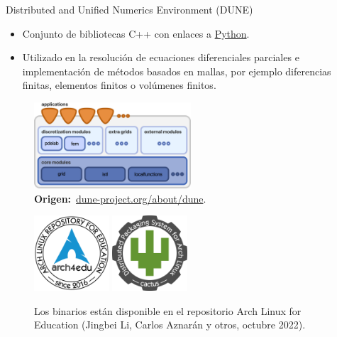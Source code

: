 \begin{frame}
\begin{alertblock}{Distributed and Unified Numerics Environment (DUNE)}
\begin{itemize}
			\item

			      Conjunto de bibliotecas \alert{C++} con enlaces a
			      \href{https://pypi.org/search/?q=dune-}{\alert{Python}}.


			\item

			      Utilizado en la resolución de
			      \alert{ecuaciones diferenciales parciales} e
			      implementación de métodos basados en mallas, por ejemplo
			      diferencias finitas, elementos finitos o volúmenes
			      finitos.
		\end{itemize}
	\end{alertblock}


	\begin{minipage}{0.45\textwidth}
		\begin{figure}[ht!]
			\centering
			\includegraphics[height=3.2cm]{dunedesign}
			\caption*{\textbf{Origen:}~\url{dune-project.org/about/dune}.}
		\end{figure}
	\end{minipage}\qquad\qquad
	\begin{minipage}{0.45\textwidth}
		\begin{figure}[ht!]
			\centering
			\href{https://github.com/arch4edu/arch4edu}{\includegraphics[height=2.8cm]{arch4edu}}\quad\quad
			\href{https://github.com/arch4edu/cactus}{\includegraphics[height=2.8cm]{cactus}}
			\caption{Los binarios están disponible en el repositorio
				\alert{Arch Linux for Education}
				(Jingbei Li, Carlos Aznarán y otros, octubre 2022).
			}
		\end{figure}
	\end{minipage}
\end{frame}

